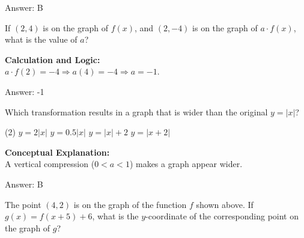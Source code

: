 \documentclass[11pt,paper=a4,answers]{exam}
\begin{document}
\begin{questions}
\begin{solution}
\vspace{25pt}

Answer: \colorbox{yellow!100}{B}
\end{solution}

\vspace{40pt}

\question
If $(2, 4)$ is on the graph of $f(x)$, and $(2, -4)$ is on the graph of $a \cdot f(x)$, what is the value of $a$?

\begin{solution}
\textbf{Calculation and Logic:} \\
$a \cdot f(2) = -4 \Rightarrow a(4) = -4 \Rightarrow a = -1$.

\vspace{25pt}

Answer: \colorbox{yellow!100}{-1}
\end{solution}

\vspace{40pt}

\question
Which transformation results in a graph that is wider than the original $y = |x|$?
\begin{tasks}(2)
    \task $y = 2|x|$
    \task $y = 0.5|x|$
    \task $y = |x| + 2$
    \task $y = |x+2|$
\end{tasks}

\begin{solution}
\textbf{Conceptual Explanation:} \\
A vertical compression ($0 < a < 1$) makes a graph appear wider.

\vspace{25pt}

Answer: \colorbox{yellow!100}{B}
\end{solution}


\question
\begin{center}
\end{center}
The point $(4, 2)$ is on the graph of the function $f$ shown above. If $g(x) = f(x+5) + 6$, what is the $y$-coordinate of the corresponding point on the graph of $g$?


\end{questions}
\end{document}
